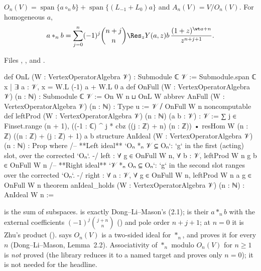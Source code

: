 \begin{definition}\label{l13:def:onfull}
$O_n(V) = \operatorname{span}\{a\circ_nb\} + \operatorname{span}\{(L_{-1}+L_0)a\}$ and $A_n(V) = V/O_n(V)$. For homogeneous $a$,
\begin{equation*}
 a*_nb = \sum_{j=0}^n(-1)^j\binom{n+j}{n}\Res_zY(a,z)b\,\frac{(1+z)^{\wt a+n}}{z^{n+j+1}}.
\end{equation*}
\end{definition}
\noindent Files ,
,
 and
.
\begin{leancode}
def OnL (W : VertexOperatorAlgebra 𝒱) : Submodule ℂ 𝒱 :=
  Submodule.span ℂ {x | ∃ a : 𝒱, x = W.L (-1) a + W.L 0 a}
def OnFull (W : VertexOperatorAlgebra 𝒱) (n : ℕ) : Submodule ℂ 𝒱 :=
  On W n ⊔ OnL W
abbrev AnFull (W : VertexOperatorAlgebra 𝒱) (n : ℕ) : Type u := 𝒱 ⧸ OnFull W n
noncomputable def leftProd (W : VertexOperatorAlgebra 𝒱) (n : ℕ) (a b : 𝒱) : 𝒱 :=
  ∑ j ∈ Finset.range (n + 1),
    ((-1 : ℂ) ^ j * cbz ((j : ℤ) + n) (n : ℤ)) •
      resHom W (n : ℤ) ((n : ℤ) + (j : ℤ) + 1) a b
structure AnIdeal (W : VertexOperatorAlgebra 𝒱) (n : ℕ) : Prop where
  /-- **Left ideal** `Oₙ *ₙ 𝒱 ⊆ Oₙ`: `g` in the first (acting) slot, over the corrected `Oₙ`. -/
  left : ∀ g ∈ OnFull W n, ∀ b : 𝒱, leftProd W n g b ∈ OnFull W n
  /-- **Right ideal** `𝒱 *ₙ Oₙ ⊆ Oₙ`: `g` in the second slot ranges over the corrected `Oₙ`. -/
  right : ∀ a : 𝒱, ∀ g ∈ OnFull W n, leftProd W n a g ∈ OnFull W n
theorem anIdeal_holds (W : VertexOperatorAlgebra 𝒱) (n : ℕ) : AnIdeal W n :=
\end{leancode}

\begin{dictionary}
 is the sum of subspaces.  is exactly Dong--Li--Mason's (2.1);  is their
$a*_nb$ with the external coefficients $(-1)^j\binom{j+n}{n}$ () and pole order $n+j+1$; at
$n = 0$ it is Zhu's product ().  says $O_n(V)$ is a
two-sided ideal for $*_n$, and  proves it for every $n$ (Dong--Li--Mason, Lemma~2.2). Associativity of
$*_n$ modulo $O_n(V)$ for $n\ge1$ is \emph{not} proved (the library reduces it to a named target  and proves
only $n = 0$); it is not needed for the headline.
\end{dictionary}

